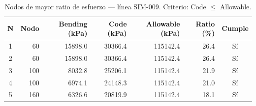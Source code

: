 \begin{table}[htbp]
  \centering
  \small
  \caption{Nodos de mayor ratio de esfuerzo — línea SIM-009. Criterio: Code $\leq$ Allowable.}
  \label{tab:top5-ratio}
  \begin{tabular}{crrrrrc}
    \toprule
    N & Nodo & Bending (\si{kPa}) & Code (\si{kPa}) & Allowable (\si{kPa}) & Ratio (\%) & Cumple \\
    \midrule
    1 & 60 & \num{15898.0} & \num{30366.4} & \num{115142.4} & 26.4 & Sí \\
    2 & 60 & \num{15898.0} & \num{30366.4} & \num{115142.4} & 26.4 & Sí \\
    3 & 100 & \num{8032.8} & \num{25206.1} & \num{115142.4} & 21.9 & Sí \\
    4 & 100 & \num{6974.1} & \num{24148.3} & \num{115142.4} & 21.0 & Sí \\
    5 & 160 & \num{6326.6} & \num{20819.9} & \num{115142.4} & 18.1 & Sí \\
    \bottomrule
  \end{tabular}
\end{table}

